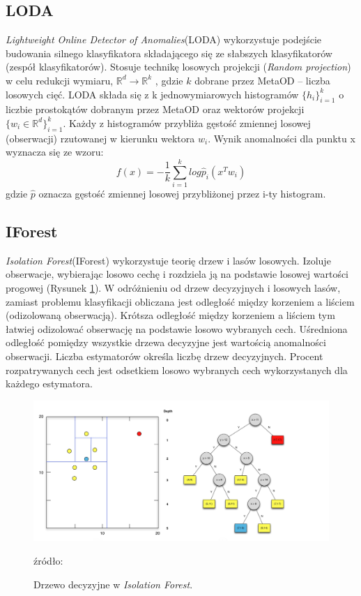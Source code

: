 \subsection{LODA}
\label{loda}
\textit{Lightweight Online Detector of Anomalies}(LODA) \cite{loda}
wykorzystuje podejście budowania silnego klasyfikatora składającego się ze słabszych klasyfikatorów (zespół klasyfikatorów). Stosuje technikę losowych projekcji (\textit{Random projection}) w celu redukcji wymiaru, $\mathbb{R}^d \rightarrow \mathbb{R}^k$  \cite{raf2017}, gdzie $k$ dobrane przez MetaOD -- liczba losowych cięć.
LODA składa się z k jednowymiarowych histogramów $\{h_i\}^k_{i=1}$ o liczbie prostokątów dobranym przez MetaOD oraz wektorów projekcji $\{w_i \in \mathbb{R}^d \}^k_{i=1}$. Każdy z histogramów przybliża gęstość zmiennej losowej (obserwacji) rzutowanej w kierunku wektora $w_i$. 
Wynik anomalności dla punktu x wyznacza się ze wzoru:
\begin{equation}
    f(x) = -\frac{1}{k}\sum\limits^k_{i=1}log\hat{p}_i(x^Tw_i)
\end{equation}
gdzie $\hat{p}$ oznacza gęstość zmiennej losowej przybliżonej przez i-ty histogram.
\subsection{IForest}
\label{iforest}
\label{sub:IF}
\textit{Isolation Forest}(IForest) \cite{iforest} wykorzystuje teorię drzew i lasów losowych. Izoluje obserwacje, wybierając losowo cechę i rozdziela ją na podstawie losowej wartości progowej (Rysunek \ref{fig:iforest}). W odróżnieniu od drzew decyzyjnych i losowych lasów, zamiast problemu klasyfikacji obliczana jest odległość między korzeniem a liściem (odizolowaną obserwacją). Krótsza odległość między korzeniem a liściem tym łatwiej odizolować obserwację na podstawie losowo wybranych cech. Uśredniona odległość pomiędzy wszystkie drzewa decyzyjne jest wartością anomalności obserwacji. Liczba estymatorów określa liczbę drzew decyzyjnych. Procent rozpatrywanych cech jest odsetkiem losowo wybranych cech wykorzystanych dla każdego estymatora.

\begin{figure}[h]
    \centering
    \includegraphics[width=.8\textwidth]{chapters/MetaOD/images/iforest.jpg}
    \caption{Drzewo decyzyjne w \textit{Isolation Forest}.}
    \footnotesize{źródło: \cite{if-image}}
    \label{fig:iforest}
\end{figure}

